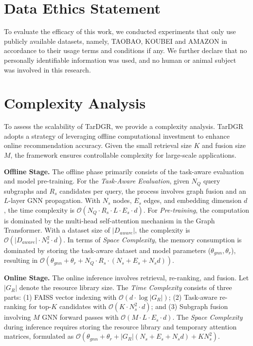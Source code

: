 \documentclass[letterpaper]{article} %
\begin{document}
\section{Data Ethics Statement}
To evaluate the efficacy of this
work, we conducted experiments that only use publicly available
datasets, namely, TAOBAO, KOUBEI and AMAZON in accordance to their usage terms
and conditions if any. We further declare that no personally identifiable information was
used, and no human or animal subject was involved in this research.


\section{Complexity Analysis}

To assess the scalability of TarDGR, we provide a complexity analysis. TarDGR adopts a strategy of leveraging offline computational investment to enhance online recommendation accuracy. Given the small retrieval size $K$ and fusion size $M$, the framework ensures controllable complexity for large-scale applications.

\noindent\textbf{Offline Stage.} The offline phase primarily consists of the task-aware evaluation and model pre-training.
For the \textit{Task-Aware Evaluation}, given $N_Q$ query subgraphs and $R_s$ candidates per query, the process involves graph fusion and an $L$-layer GNN propagation. With $N_s$ nodes, $E_s$ edges, and embedding dimension $d$, the time complexity is $\mathcal{O}(N_Q \cdot R_s \cdot L \cdot E_s \cdot d)$.
For \textit{Pre-training}, the computation is dominated by the multi-head self-attention mechanism in the Graph Transformer. With a dataset size of $|D_{aware}|$, the complexity is $\mathcal{O}(|D_{aware}| \cdot N_s^2 \cdot d)$.
In terms of \textit{Space Complexity}, the memory consumption is dominated by storing the task-aware dataset and model parameters ($\theta_{gnn}, \theta_r$), resulting in $\mathcal{O}(\theta_{gnn} + \theta_r + N_Q \cdot R_s \cdot (N_s + E_s + N_s d))$.

\noindent\textbf{Online Stage.} The online inference involves retrieval, re-ranking, and fusion. Let $|G_R|$ denote the resource library size.
The \textit{Time Complexity} consists of three parts: (1) FAISS vector indexing with $\mathcal{O}(d \cdot \log |G_R|)$; (2) Task-aware re-ranking for top-$K$ candidates with $\mathcal{O}(K \cdot N_s^2 \cdot d)$; and (3) Subgraph fusion involving $M$ GNN forward passes with $\mathcal{O}(M \cdot L \cdot E_s \cdot d)$.
The \textit{Space Complexity} during inference requires storing the resource library and temporary attention matrices, formulated as $\mathcal{O}(\theta_{gnn} + \theta_r + |G_R| (N_s + E_s + N_s d) + K N_s^2)$.
\end{document}
